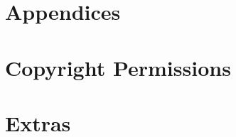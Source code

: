 \documentclass[a4paper,10pt]{article}
\begin{document}
\section{Appendices}

\section{Copyright Permissions}

\section{Extras}
\end{document}
